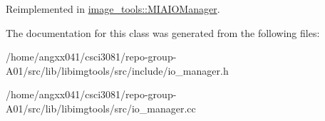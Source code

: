 Reimplemented in \hyperlink{classimage__tools_1_1MIAIOManager_a209180ddcfe3bf43d8fd7c6635391ea4}{image\+\_\+tools\+::\+M\+I\+A\+I\+O\+Manager}.



The documentation for this class was generated from the following files\+:\begin{DoxyCompactItemize}
\item 
/home/angxx041/csci3081/repo-\/group-\/\+A01/src/lib/libimgtools/src/include/io\+\_\+manager.\+h\item 
/home/angxx041/csci3081/repo-\/group-\/\+A01/src/lib/libimgtools/src/io\+\_\+manager.\+cc\end{DoxyCompactItemize}

